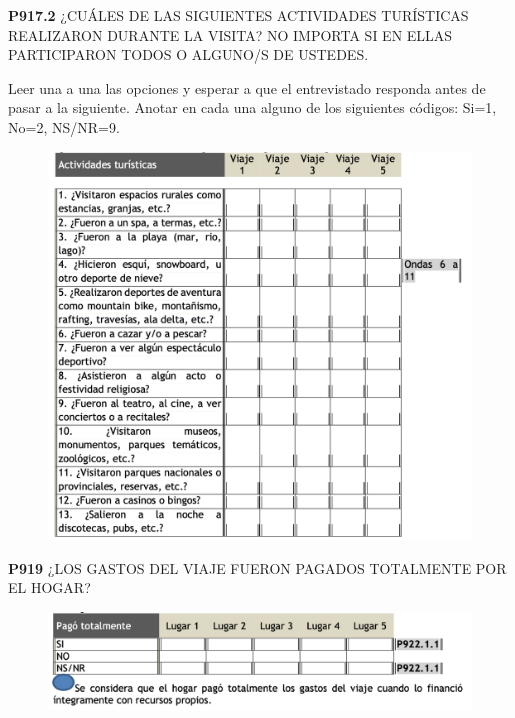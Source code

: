 \documentclass[
  openany]{book}
\begin{document}
\textbf{P917.2} ¿CUÁLES DE LAS SIGUIENTES ACTIVIDADES TURÍSTICAS REALIZARON DURANTE LA VISITA? NO IMPORTA SI EN ELLAS PARTICIPARON TODOS O ALGUNO/S DE USTEDES.

Leer una a una las opciones y esperar a que el entrevistado responda antes de pasar a la siguiente. Anotar en cada una alguno de los siguientes códigos: Si=1, No=2, NS/NR=9.

\begin{figure}

{\centering \includegraphics[width=1\linewidth]{imagenes/figura6-293} 

}

\end{figure}

\textbf{P919} ¿LOS GASTOS DEL VIAJE FUERON PAGADOS TOTALMENTE POR EL HOGAR?

\begin{figure}

{\centering \includegraphics[width=1\linewidth]{imagenes/figura6-294} 

}

\end{figure}
\end{document}
